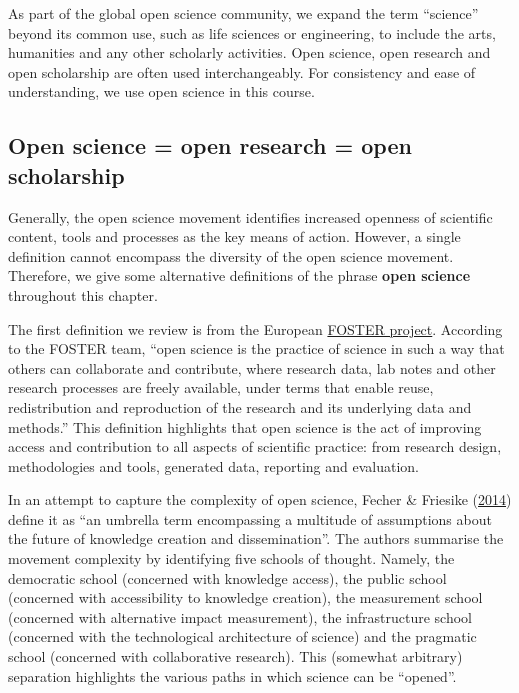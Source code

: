 \documentclass[
]{book}
\begin{document}
As part of the global open science community, we expand the term ``science'' beyond its common use, such as life sciences or engineering, to include the arts, humanities and any other scholarly activities. Open science, open research and open scholarship are often used interchangeably. For consistency and ease of understanding, we use open science in this course.

\hypertarget{open-science-open-research-open-scholarship}{%
\subsection{Open science = open research = open scholarship}\label{open-science-open-research-open-scholarship}}

Generally, the open science movement identifies increased openness of scientific content, tools and processes as the key means of action. However, a single definition cannot encompass the diversity of the open science movement. Therefore, we give some alternative definitions of the phrase \textbf{open science} throughout this chapter.

The first definition we review is from the European \href{https://www.fosteropenscience.eu/}{FOSTER project}. According to the FOSTER team, ``open science is the practice of science in such a way that others can collaborate and contribute, where research data, lab notes and other research processes are freely available, under terms that enable reuse, redistribution and reproduction of the research and its underlying data and methods.'' This definition highlights that open science is the act of improving access and contribution to all aspects of scientific practice: from research design, methodologies and tools, generated data, reporting and evaluation.

In an attempt to capture the complexity of open science, Fecher \& Friesike (\href{https://www.researchgate.net/publication/236607487_Open_Science_One_Term_Five_Schools_of_Thought}{2014}) define it as ``an umbrella term encompassing a multitude of assumptions about the future of knowledge creation and dissemination''. The authors summarise the movement complexity by identifying five schools of thought. Namely, the democratic school (concerned with knowledge access), the public school (concerned with accessibility to knowledge creation), the measurement school (concerned with alternative impact measurement), the infrastructure school (concerned with the technological architecture of science) and the pragmatic school (concerned with collaborative research). This (somewhat arbitrary) separation highlights the various paths in which science can be ``opened''.
\end{document}
